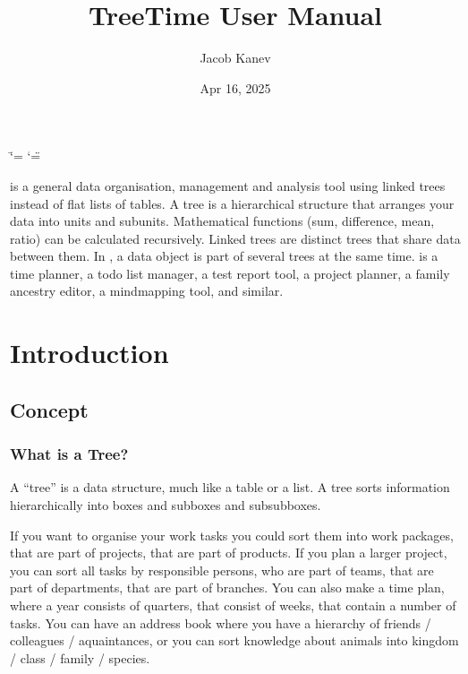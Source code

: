 \documentclass[letterpaper,10pt,english]{sphinxmanual}
\title{TreeTime User Manual}
\date{Apr 16, 2025}
\author{Jacob Kanev}
\begin{document}
\ifdefined\shorthandoff
  \ifnum\catcode`\=\string=\active\shorthandoff{=}\fi
  \ifnum\catcode`\"=\active{}\fi
\fi

\pagestyle{empty}
\sphinxmaketitle
\pagestyle{plain}
\sphinxtableofcontents
\pagestyle{normal}
\label{\detokenize{index::doc}}

\sphinxAtStartPar
{} is a general data organisation, management and analysis tool using linked trees instead of flat lists of tables.
A tree is a hierarchical structure that arranges your data into units and sub\sphinxhyphen{}units.
Mathematical functions (sum, difference, mean, ratio) can be calculated recursively.
Linked trees are distinct trees that share data between them.
In , a data object is part of several trees at the same time.
 is a time planner, a to\sphinxhyphen{}do list manager, a test report tool, a project planner, a family ancestry editor, a mind\sphinxhyphen{}mapping tool, and similar.



\sphinxstepscope


\chapter{Introduction}
\label{\detokenize{introduction:introduction}}\label{\detokenize{introduction::doc}}

\section{Concept}
\label{\detokenize{introduction:concept}}

\subsection{What is a Tree?}
\label{\detokenize{introduction:what-is-a-tree}}
\sphinxAtStartPar
A “tree” is a data structure, much like a table or a list.
A tree sorts information hierarchically into boxes and sub\sphinxhyphen{}boxes and sub\sphinxhyphen{}sub\sphinxhyphen{}boxes.

\sphinxAtStartPar
If you want to organise your work tasks you could sort them into work packages, that are part of projects, that are part of products.
If you plan a larger project, you can sort all tasks by responsible persons, who are part of teams, that are part of departments, that are part of branches.
You can also make a time plan, where a year consists of quarters, that consist of weeks, that contain a number of tasks.
You can have an address book where you have a hierarchy of friends / colleagues / aquaintances, or you can sort knowledge about animals into kingdom / class / family / species.
\end{document}
